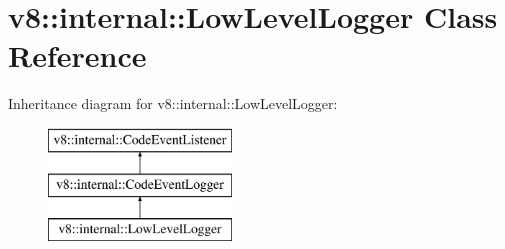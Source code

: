 \hypertarget{classv8_1_1internal_1_1_low_level_logger}{}\section{v8\+:\+:internal\+:\+:Low\+Level\+Logger Class Reference}
\label{classv8_1_1internal_1_1_low_level_logger}
Inheritance diagram for v8\+:\+:internal\+:\+:Low\+Level\+Logger\+:\begin{figure}[H]
\begin{center}
\leavevmode
\includegraphics[height=3.000000cm]{classv8_1_1internal_1_1_low_level_logger}
\end{center}
\end{figure}
